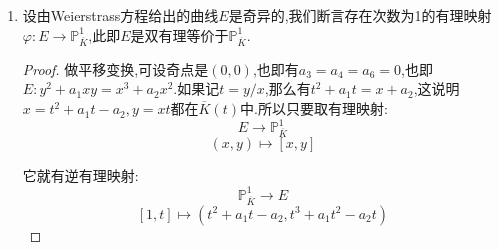 \begin{enumerate}
\begin{proof}
		\qquad
		
		设$t$是$O$点的uniformizer,我们解释过$\mathrm{ord}_O(x)=-2$和$\mathrm{ord}_O(y)=-3$,于是有$x=t^{-2}f$和$y=t^{-3}g$,其中$f,g$是$E$上的有理函数,均不以$O$为零点或极点.我们有:
		$$\omega=\frac{\mathrm{d}x}{F_y(x,y)}=\frac{-2t^{-3}f+t^{-2}f'}{2t^{-3}g+a_1t^{-2}f+a_3}\mathrm{d}t=\frac{-2f+tf'}{2g+a_1tf+a_3t^3}\mathrm{d}t$$
		
		其中$f'=\mathrm{d}f/\mathrm{d}t$.我们知道一般的如果$f$在点$O$正则,那么$f'$也在点$O$正则.那么如果$\mathrm{char}(K)\not=2$,则该式在$O$处正则并且不为零,于是$\mathrm{ord}_O(\omega)=0$.如果$\mathrm{char}(K)=2$,我们用$\omega=\frac{\mathrm{d}y}{F_x(x,y)}$类似的得到结论.
	\end{proof}
	\item 设由Weierstrass方程给出的曲线$E$是奇异的,我们断言存在次数为1的有理映射$\varphi:E\to\mathbb{P}_{\overline{K}}^1$,此即$E$是双有理等价于$\mathbb{P}_{\overline{K}}^1$.
	\begin{proof}
		
		做平移变换,可设奇点是$(0,0)$,也即有$a_3=a_4=a_6=0$,也即$E:y^2+a_1xy=x^3+a_2x^2$.如果记$t=y/x$,那么有$t^2+a_1t=x+a_2$,这说明$x=t^2+a_1t-a_2,y=xt$都在$\overline{K}(t)$中.所以只要取有理映射:
		$$E\to\mathbb{P}_{\overline{K}}^1$$
		$$(x,y)\mapsto[x,y]$$
		
		它就有逆有理映射:
		$$\mathbb{P}_{\overline{K}}^1\to E$$
		$$[1,t]\mapsto(t^2+a_1t-a_2,t^3+a_1t^2-a_2t)$$
	\end{proof}
\end{enumerate}

